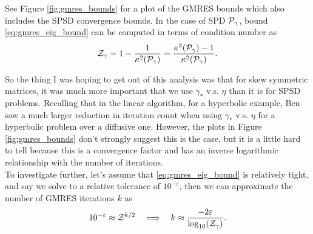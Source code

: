 \documentclass[a4paper,10pt]{article}
\begin{document}
{See Figure \ref{fig:gmres_bounds} for a plot of the GMRES bounds which also includes the SPSD convergence bounds. In the case of SPD ${\cal P}_{\gamma}$, bound \eqref{eq:gmres_eig_bound} can be computed in terms of condition number as 
\begin{align}
\label{eq:gmres_bounds_spd}
{\cal Z}_{\gamma} = 1 - \frac{1}{\kappa^2({\cal P}_{\gamma})} = \frac{\kappa^2({\cal P}_{\gamma}) - 1}{\kappa^2({\cal P}_{\gamma})}.
\end{align}


So the thing I was hoping to get out of this analysis was that for skew symmetric matrices, it was much more important that we use $\gamma_*$ v.s. $\eta$ than it is for SPSD problems. Recalling that in the linear algorithm, for a hyperbolic example, Ben saw a much larger reduction in iteration count when using $\gamma_*$ v.s. $\eta$ for a hyperbolic problem over a diffusive one. However, the plots in Figure \ref{fig:gmres_bounds} don't strongly suggest this is the case, but it is a little hard to tell because this is a convergence factor and has an inverse logarithmic relationship with the number of iterations. \\

To investigate further, let's assume that \eqref{eq:gmres_eig_bound} is relatively tight, and say we solve to a relative tolerance of $10^{-\varepsilon}$, then we can approximate the number of GMRES iterations $k$ as
\begin{align}
\label{eq:gmres_approx_iters}
10^{-\varepsilon} \approx {\cal Z}^{k/2} 
\quad \Longrightarrow \quad
k \approx \frac{-2 \varepsilon}{\log_{10} ({\cal Z}_{\gamma})}.
\end{align}

}
\end{document}
